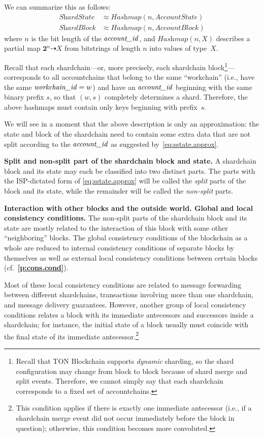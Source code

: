\documentclass[12pt,oneside]{article}
\def\makepoint#1{\medbreak\noindent{\bf #1.\ }}
\def\nxsubpoint{\refstepcounter{subsubsection}%
  \smallbreak\makepoint{\thesubsubsection}}
\def\refpoint#1{{\rm\textbf{\ref{#1}}}}
\let\ptref=\refpoint
\def\emb#1{\textbf{#1.}}
\let\tp=\textit
\let\vr=\textit
\def\workchainid{\vr{workchain\_id\/}}
\def\accountid{\vr{account\_id\/}}
\def\Hashmap{\tp{Hashmap}}
\def\st#1{{\mathbf{#1}}}
\begin{document}
We can summarize this as follows:
\begin{align}\label{eq:sstate.approx}
  \textit{ShardState}&\approx\Hashmap(n,\textit{AccountState})\\
  \textit{ShardBlock}&\approx\Hashmap(n,\textit{AccountBlock})
\end{align}
where $n$ is the bit length of the $\accountid$, and $\Hashmap(n,X)$ describes a partial map $\st2^n\dashrightarrow X$ from bitstrings of length $n$ into values of type~$X$.

Recall that each shardchain---or, more precisely, each shardchain block\footnote{Recall that TON Blockchain supports {\em dynamic\/} sharding, so the shard configuration may change from block to block because of shard merge and split events. Therefore, we cannot simply say that each shardchain corresponds to a fixed set of accountchains.}---corresponds to all accountchains that belong to the same ``workchain'' (i.e., have the same $\workchainid=w$) and have an $\accountid$ beginning with the same binary prefix $s$, so that $(w,s)$ completely determines a shard. Therefore, the above hashmaps must contain only keys beginning with prefix~$s$.

We will see in a moment that the above description is only an approximation: the state and block of the shardchain need to contain some extra data that are not split according to the $\accountid$ as suggested by~\eqref{eq:sstate.approx}.

\nxsubpoint\label{sp:split.blk.part}\emb{Split and non-split part of the shardchain block and state}
A shardchain block and its state may each be classified into two distinct parts. The parts with the ISP-dictated form of \eqref{eq:sstate.approx} will be called the {\em split\/} parts of the block and its state, while the remainder will be called the {\em non-split\/} parts.

\nxsubpoint\label{sp:blk.inter.1}\emb{Interaction with other blocks and the outside world. Global and local consistency conditions}
The non-split parts of the shardchain block and its state are mostly related to the interaction of this block with some other ``neighboring'' blocks. The global consistency conditions of the blockchain as a whole are reduced to internal consistency conditions of separate blocks by themselves as well as external local consistency conditions between certain blocks (cf.~\ptref{p:cons.cond}).

Most of these local consistency conditions are related to message forwarding between different shardchains, transactions involving more than one shardchain, and message delivery guarantees. However, another group of local consistency conditions relates a block with its immediate antecessors and successors inside a shardchain; for instance, the initial state of a block usually must coincide with the final state of its immediate antecessor.\footnote{This condition applies if there is exactly one immediate antecessor (i.e., if a shardchain merge event did not occur immediately before the block in question); otherwise, this condition becomes more convoluted.}
\end{document}
